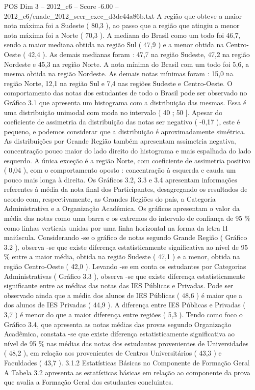 \begin{textsample}{POS Dim 3 – 2012\_c6 – Score -6.00 – 2012\_c6/enade\_2012\_secr\_exec\_d3dc44a86b.txt}
A região que obteve a maior nota máxima foi a Sudeste ( 80,3 ), ao passo que a região que atingiu a menor nota máxima foi a Norte ( 70,3 ).
A mediana do Brasil como um todo foi 46,7, sendo a maior mediana obtida na região Sul ( 47,9 ) e a menor obtida na Centro-Oeste ( 42,4 ).
As demais medianas foram : 47,7 na região Sudeste, 47,2 na região Nordeste e 45,3 na região Norte.
A nota mínima do Brasil com um todo foi 5,6, a mesma obtida na região Nordeste.
As demais notas mínimas foram : 15,0 na região Norte, 12,1 na região Sul e 7,4 nas regiões Sudeste e Centro-Oeste.
O comportamento das notas dos estudantes de todo o Brasil pode ser observado no Gráfico 3.1 que apresenta um histograma com a distribuição das mesmas.
Essa é uma distribuição unimodal com moda no intervalo ( 40 ; 50 ].
Apesar do coeficiente de assimetria da distribuição das notas ser negativo ( -0,17 ), este é pequeno, e podemos considerar que a distribuição é aproximadamente simétrica.
As distribuições por Grande Região também apresentam assimetria negativa, concentração pouco maior do lado direito do histograma e mais espalhada do lado esquerdo.
A única exceção é a região Norte, com coeficiente de assimetria positivo ( 0,04 ), com o comportamento oposto : concentração à esquerda e cauda um pouco mais longa à direita.
Os Gráficos 3.2, 3.3 e 3.4 apresentam informações referentes à média da nota final dos Participantes, desagregando os resultados de acordo com, respectivamente, as Grandes Regiões do país, a Categoria Administrativa e a Organização Acadêmica.
Os gráficos apresentam o valor da média das notas como uma barra e os extremos do intervalo de confiança de 95 \% como linhas verticais unidas por uma linha horizontal na forma da letra H maiúscula.
Considerando -se o gráfico de notas segundo Grande Região ( Gráfico 3.2 ), observa -se que existe diferença estatisticamente significativa ao nível de 95 \% entre a maior média, obtida na região Sudeste ( 47,1 ) e a menor, obtida na região Centro-Oeste ( 42,0 ).
Levando -se em conta os estudantes por Categorias Administrativas ( Gráfico 3.3 ), observa -se que existe diferença estatisticamente significante entre as médias das notas das IES Públicas e Privadas.
Pode ser observado ainda que a média dos alunos de IES Públicas ( 48,6 ) é maior que a dos alunos de IES Privadas ( 44,9 ).
A diferença entre IES Públicas e Privadas ( 3,7 ) é menor do que a maior diferença entre regiões ( 5,3 ).
Tendo como foco o Gráfico 3.4, que apresenta as notas médias das provas segundo Organização Acadêmica, constata -se que existe diferença estatisticamente significativa ao nível de 95 \% nas médias das notas dos estudantes provenientes de Universidades ( 48,2 ), em relação aos provenientes de Centros Universitários ( 43,3 ) e Faculdades ( 43,7 ). 3.1.2 Estatísticas Básicas no Componente de Formação Geral A Tabela 3.2 apresenta as estatísticas básicas em relação ao componente da prova que avalia a Formação Geral dos estudantes concluintes.

\end{textsample}
